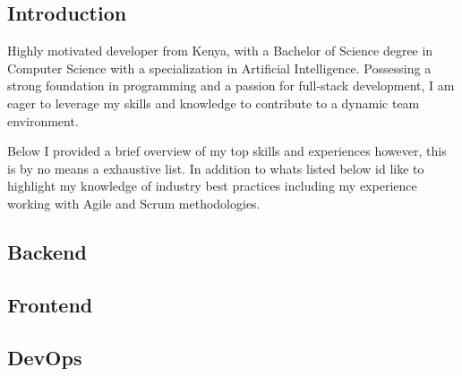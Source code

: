 \documentclass{modernsimplecv}
\newlength{\rightcolwidth}
\begin{document}
\begin{paracol}{2}
{}
\switchcolumn

\section{Introduction} 
{\small
Highly motivated developer from Kenya, with a Bachelor of Science degree in Computer Science with a specialization in Artificial Intelligence. Possessing a strong foundation in programming and a passion for full-stack development, I am eager to leverage my skills and knowledge to contribute to a dynamic team environment.

\hfill \break
Below I provided  a brief overview of my top skills and experiences however, this is by no means a exhaustive list. In addition to whats listed below id like to highlight my knowledge of industry best practices including my experience working with Agile and Scrum methodologies.}

\subsection*{Backend}

\begin{skillsection}{\rightcolwidth}
\end{skillsection}

\subsection*{Frontend}

\begin{skillsection}{\rightcolwidth}
\end{skillsection}

\subsection*{DevOps}

\begin{skillsection}{\rightcolwidth}
\end{skillsection}


\end{paracol}
\end{document}
